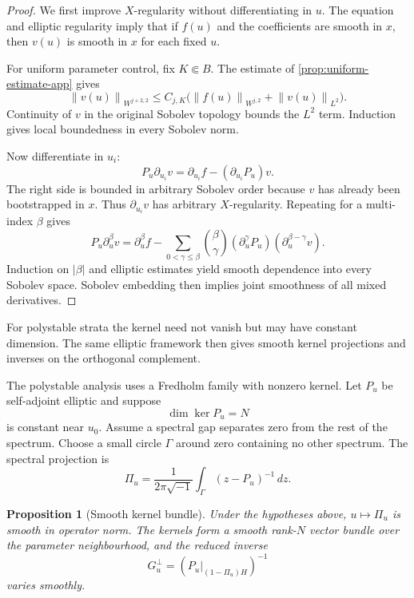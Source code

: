 \documentclass[11pt,reqno]{amsart}
\newtheorem{proposition}[theorem]{Proposition}
\theoremstyle{definition}
\theoremstyle{remark}
\newcommand{\norm}[1]{\left\lVert #1\right\rVert}
\newcommand{\abs}[1]{\left\lvert #1\right\rvert}
\begin{document}
\begin{proof}
We first improve $X$-regularity without differentiating in $u$.  The equation and elliptic regularity imply that if $f(u)$ and the coefficients are smooth in $x$, then $v(u)$ is smooth in $x$ for each fixed $u$.

For uniform parameter control, fix $K\Subset B$.  The estimate of \cref{prop:uniform-estimate-app} gives
\[
  \norm{v(u)}_{W^{j+2,2}}
  \le C_{j,K}
  \bigl(\norm{f(u)}_{W^{j,2}}+\norm{v(u)}_{L^2}\bigr).
\]
Continuity of $v$ in the original Sobolev topology bounds the $L^2$ term.  Induction gives local boundedness in every Sobolev norm.

Now differentiate in $u_i$:
\[
  P_u\partial_{u_i}v
  =\partial_{u_i}f-(\partial_{u_i}P_u)v.
\]
The right side is bounded in arbitrary Sobolev order because $v$ has already been bootstrapped in $x$.  Thus $\partial_{u_i}v$ has arbitrary $X$-regularity.  Repeating for a multi-index $\beta$ gives
\[
  P_u\partial_u^\beta v
  =\partial_u^\beta f
  -\sum_{0<\gamma\le\beta}
  \binom{\beta}{\gamma}
  (\partial_u^\gamma P_u)
  (\partial_u^{\beta-\gamma}v).
\]
Induction on $\abs\beta$ and elliptic estimates yield smooth dependence into every Sobolev space.  Sobolev embedding then implies joint smoothness of all mixed derivatives.
\end{proof}


For polystable strata the kernel need not vanish but may have constant dimension.  The same elliptic framework then gives smooth kernel projections and inverses on the orthogonal complement.


The polystable analysis uses a Fredholm family with nonzero kernel.  Let $P_u$ be self-adjoint elliptic and suppose
\[
  \dim\ker P_u=N
\]
is constant near $u_0$.  Assume a spectral gap separates zero from the rest of the spectrum.  Choose a small circle $\Gamma$ around zero containing no other spectrum.  The spectral projection is
\begin{equation}\label{eq:Riesz-projection}
  \Pi_u=\frac1{2\pi\sqrt{-1}}
  \int_\Gamma(z-P_u)^{-1}\,dz.
\end{equation}

\begin{proposition}[Smooth kernel bundle]\label{prop:smooth-kernel-bundle-app}
Under the hypotheses above, $u\mapsto\Pi_u$ is smooth in operator norm.  The kernels form a smooth rank-$N$ vector bundle over the parameter neighbourhood, and the reduced inverse
\[
  G_u^\perp=(P_u|_{(1-\Pi_u)H})^{-1}
\]
varies smoothly.
\end{proposition}
\end{document}
